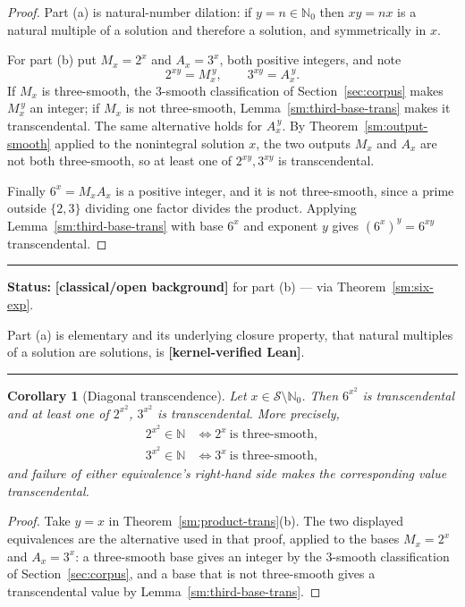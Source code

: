 \documentclass[11pt,oneside]{article}
\newtheorem{corollary}[theorem]{Corollary}
\theoremstyle{definition}
\theoremstyle{remark}
\newcommand{\N}{\mathbb N}
\newcommand{\Nzero}{\mathbb N_0}
\newcommand{\Sol}{\mathcal S}
\newcommand{\statuslean}{\textcolor{leanblue}{\textbf{[kernel-verified Lean]}}}
\newcommand{\statusknown}{\textcolor{classicalgray}{\textbf{[classical/open background]}}}
\newenvironment{statusbox}[1]
{\begin{center}\begin{minipage}{0.94\textwidth}\raggedright\hbadness=10000\hrule
\vspace{0.45em}\textbf{Status:} #1\par\vspace{0.35em}}
{\vspace{0.35em}\hrule\end{minipage}\end{center}}
\begin{document}
\begin{proof}
Part (a) is natural-number dilation: if $y=n\in\Nzero$ then $xy=nx$ is a natural multiple of
a solution and therefore a solution, and symmetrically in $x$.

For part (b) put $M_x=2^x$ and $A_x=3^x$, both positive integers, and note
\[
 2^{xy}=M_x^{\,y},\qquad 3^{xy}=A_x^{\,y}.
\]
If $M_x$ is three-smooth, the $3$-smooth classification of Section~\ref{sec:corpus} makes
$M_x^{\,y}$ an integer; if $M_x$ is not three-smooth, Lemma~\ref{sm:third-base-trans} makes
it transcendental.  The same alternative holds for $A_x^{\,y}$.  By
Theorem~\ref{sm:output-smooth} applied to the nonintegral solution $x$, the two outputs
$M_x$ and $A_x$ are not both three-smooth, so at least one of $2^{xy},3^{xy}$ is
transcendental.

Finally $6^x=M_xA_x$ is a positive integer, and it is not three-smooth, since a prime outside
$\{2,3\}$ dividing one factor divides the product.  Applying
Lemma~\ref{sm:third-base-trans} with base $6^x$ and exponent $y$ gives
$(6^x)^y=6^{xy}$ transcendental.
\end{proof}

\begin{statusbox}{\statusknown{} for part (b) --- via Theorem~\ref{sm:six-exp}.}
Part (a) is elementary and its underlying closure property, that natural multiples of a
solution are solutions, is \statuslean{}.
\end{statusbox}

\begin{corollary}[Diagonal transcendence]
\label{sm:diagonal-trans}
Let $x\in\Sol\setminus\Nzero$.  Then $6^{x^2}$ is transcendental and at least one of
$2^{x^2}$, $3^{x^2}$ is transcendental.  More precisely,
\[
\begin{aligned}
 2^{x^2}\in\N &\iff 2^x\ \text{is three-smooth},\\
 3^{x^2}\in\N &\iff 3^x\ \text{is three-smooth},
\end{aligned}
\]
and failure of either equivalence's right-hand side makes the corresponding value
transcendental.
\end{corollary}

\begin{proof}
Take $y=x$ in Theorem~\ref{sm:product-trans}(b).  The two displayed equivalences are the
alternative used in that proof, applied to the bases $M_x=2^x$ and $A_x=3^x$: a three-smooth
base gives an integer by the $3$-smooth classification of Section~\ref{sec:corpus}, and a
base that is not three-smooth gives a transcendental value by
Lemma~\ref{sm:third-base-trans}.
\end{proof}
\end{document}

